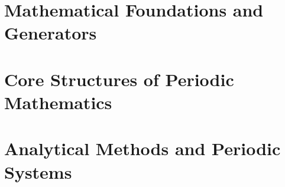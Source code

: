 






\frontmatter



\mainmatter



\part{Mathematical Foundations and Generators}











\part{Core Structures of Periodic Mathematics}











\part{Analytical Methods and Periodic Systems}





